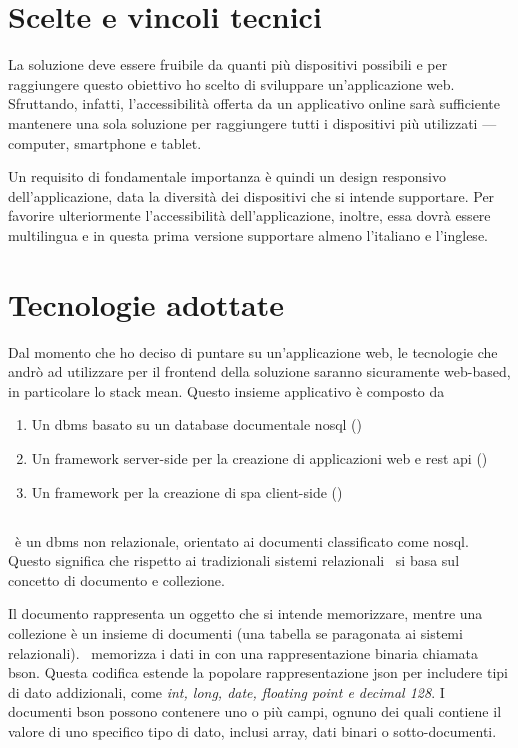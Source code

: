 \section{Scelte e vincoli tecnici} 

La soluzione deve essere fruibile da quanti più dispositivi possibili e per raggiungere questo obiettivo ho scelto di sviluppare un'applicazione web. Sfruttando, infatti, l'accessibilità offerta da un applicativo online sarà sufficiente mantenere una sola soluzione per raggiungere tutti i dispositivi più utilizzati --- computer, smartphone e tablet.

Un requisito di fondamentale importanza è quindi un design responsivo dell'applicazione, data la diversità dei dispositivi che si intende supportare. 
Per favorire ulteriormente l'accessibilità dell'applicazione, inoltre, essa dovrà essere multilingua e in questa prima versione supportare almeno l'italiano e l'inglese.

\section{Tecnologie adottate}
Dal momento che ho deciso di puntare su un'applicazione web, le tecnologie che andrò ad utilizzare per il \gls{frontend} della soluzione saranno sicuramente web-based, in particolare lo stack \gls{mean}. Questo insieme applicativo è composto da
\begin{enumerate}
	\item Un \acrshort{dbms} basato su un database documentale \acrshort{nosql} (\mongodb)
	\item Un \gls{framework} server-side per la creazione di applicazioni web e \acrshort{rest} \acrshort{api} (\expressjs)
	\item Un \gls{framework} per la creazione di \acrshort{spa} client-side (\angular)
\end{enumerate}


\subsection{\mongodb}

\mongodb~è un \gls{dbms} non relazionale, orientato ai documenti classificato come \gls{nosql}. Questo significa che rispetto ai tradizionali sistemi relazionali \mongodb~si basa sul concetto di documento e collezione.

Il documento rappresenta un oggetto che si intende memorizzare, mentre una collezione è un insieme di documenti (una tabella se paragonata ai sistemi relazionali).
\mongodb~memorizza i dati in con una rappresentazione binaria chiamata \gls{bson}. Questa codifica estende la popolare rappresentazione \gls{json} per includere tipi di dato addizionali, come \textit{int, long, date, floating point e decimal 128}. I documenti \acrshort{bson} possono contenere uno o più campi, ognuno dei quali contiene il valore di uno specifico tipo di dato, inclusi array, dati binari o sotto-documenti.

